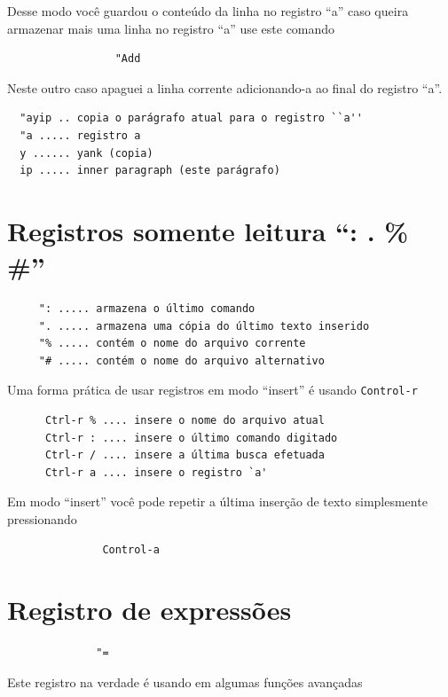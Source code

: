 \documentclass[10pt,a4paper,openany]{book}
\begin{document}
Desse modo você guardou o conteúdo da linha no registro ``a'' caso
queira armazenar mais uma linha no registro ``a'' use este comando

\begin{verbatim}
				 "Add
\end{verbatim}

Neste outro caso apaguei a linha corrente adicionando-a ao final do registro ``a''.

\begin{verbatim}
  "ayip .. copia o parágrafo atual para o registro ``a''
  "a ..... registro a
  y ...... yank (copia)
  ip ..... inner paragraph (este parágrafo)
\end{verbatim}

\section{Registros somente leitura ``: . \% \#''}
\label{Registros somente leitura}

\begin{verbatim}
	 ": ..... armazena o último comando
	 ". ..... armazena uma cópia do último texto inserido
	 "% ..... contém o nome do arquivo corrente
	 "# ..... contém o nome do arquivo alternativo
\end{verbatim}

Uma forma prática de usar registros em modo ``insert'' é usando
\verb+Control-r+


\begin{verbatim}
	  Ctrl-r % .... insere o nome do arquivo atual
	  Ctrl-r : .... insere o último comando digitado
	  Ctrl-r / .... insere a última busca efetuada
	  Ctrl-r a .... insere o registro `a'
\end{verbatim}

Em modo ``insert'' você pode repetir a última inserção de texto
simplesmente pressionando

\begin{verbatim}
			   Control-a
\end{verbatim}

\section{Registro de expressões}
\label{Registro de expressões}

\begin{verbatim}
			  "=
\end{verbatim}

Este registro na verdade é usando em algumas funções avançadas
\end{document}
